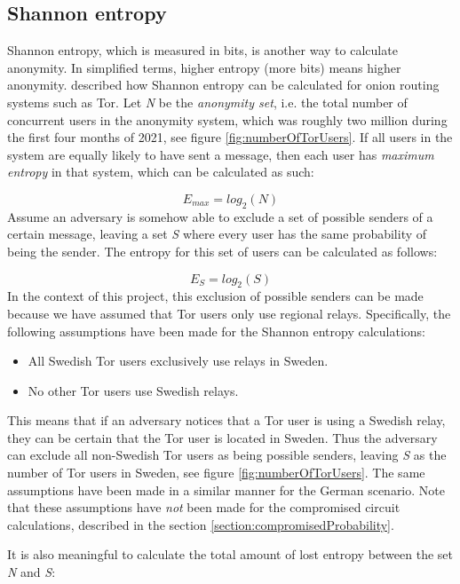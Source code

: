 \documentclass{kththesis}
\begin{document}
\subsection{Shannon entropy}
\label{section:shannonentropy}
Shannon entropy, which is measured in bits, is another way to calculate anonymity. In simplified terms, higher entropy (more bits) means higher anonymity. \textcite{diaz2002towards} described how Shannon entropy can be calculated for onion routing systems such as Tor. Let \emph{N} be the \emph{anonymity set}, i.e. the total number of concurrent users in the anonymity system, which was roughly two million during the first four months of 2021, see figure \ref{fig:numberOfTorUsers}. If all users in the system are equally likely to have sent a message, then each user has \emph{maximum entropy} in that system, which can be calculated as such:

\[E_{max} = log_{2}(N)\]
Assume an adversary is somehow able to exclude a set of possible senders of a certain message, leaving a set \emph{S} where every user has the same probability of being the sender. The entropy for this set of users can be calculated as follows:

\[E_{S} = log_{2}(S)\]
In the context of this project, this exclusion of possible senders can be made because we have assumed that Tor users only use regional relays. Specifically, the following assumptions have been made for the Shannon entropy calculations:

\begin{itemize}
  \vspace{-0.2cm}\item All Swedish Tor users exclusively use relays in Sweden.
  \vspace{-0.2cm}\item No other Tor users use Swedish relays.
\end{itemize}

This means that if an adversary notices that a Tor user is using a Swedish relay, they can be certain that the Tor user is located in Sweden. Thus the adversary can exclude all non-Swedish Tor users as being possible senders, leaving \emph{S} as the number of Tor users in Sweden, see figure \ref{fig:numberOfTorUsers}. The same assumptions have been made in a similar manner for the German scenario. Note that these assumptions have \emph{not} been made for the compromised circuit calculations, described in the section \ref{section:compromisedProbability}.

It is also meaningful to calculate the total amount of lost entropy between the set \emph{N} and \emph{S}:
\end{document}
